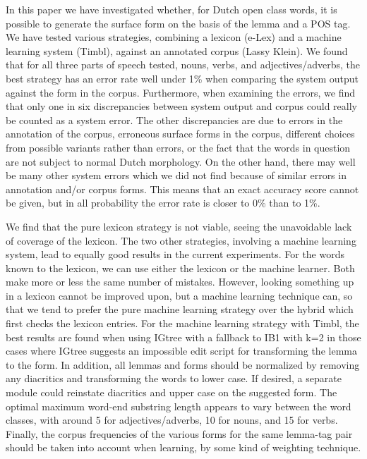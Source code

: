 \documentclass[a4paper,10pt,twoside]{article}
\begin{document}
In this paper we have investigated whether, for Dutch open class words, it is possible to generate the surface form on the basis of the lemma and a POS tag. We have tested various strategies, combining a lexicon (e-Lex) and a machine learning system (Timbl), against an annotated corpus (Lassy Klein). We found that for all three parts of speech tested, nouns, verbs, and adjectives/adverbs, the best strategy has an error rate well under 1\% when comparing the system output against the form in the corpus. Furthermore, when examining the errors, we find that only one in six discrepancies between system output and corpus could really be counted as a system error. The other discrepancies are due to errors in the annotation of the corpus, erroneous surface forms in the corpus, different choices from possible variants rather than errors, or the fact that the words in question are not subject to normal Dutch morphology. On the other hand, there may well be many other system errors which we did not find because of similar errors in annotation and/or corpus forms. This means that an exact accuracy score cannot be given, but in all probability the error rate is closer to 0\% than to 1\%. 

We find that the pure lexicon strategy is not viable, seeing the unavoidable lack of coverage of the lexicon. The two other strategies, involving a machine learning system, lead to equally good results in the current experiments. For the words known to the lexicon, we can use either the lexicon or the machine learner. Both make more or less the same number of mistakes. However, looking something up in a lexicon cannot be improved upon, but a machine learning technique can, so that we tend to prefer the pure machine learning strategy over the hybrid which first checks the lexicon entries. For the machine learning strategy with Timbl, the best results are found when using IGtree with a fallback to IB1 with k=2 in those cases where IGtree suggests an impossible edit script for transforming the lemma to the form. In addition, all lemmas and forms should be normalized by removing any diacritics and transforming the words to lower case. If desired, a separate module could reinstate diacritics and upper case on the suggested form. The optimal maximum word-end substring length appears to vary between the word classes, with around 5 for adjectives/adverbs, 10 for nouns, and 15 for verbs. Finally, the corpus frequencies of the various forms for the same lemma-tag pair should be taken into account when learning, by some kind of weighting technique.
\end{document}
